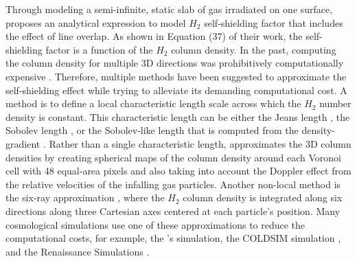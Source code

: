 \documentclass[linenumbers, twocolumn]{aastex631}
\begin{document}
Through modeling a semi-infinite, static slab of gas irradiated on one surface, \cite{Draine+1996} proposes an analytical expression to model $H_{2}$ self-shielding factor that includes the effect of line overlap. As shown in Equation (37) of their work, the self-shielding factor is a function of the $H_{2}$ column density. In the past, computing the column density for multiple 3D directions was prohibitively computationally expensive \citep{Shang+2010, Wolcott-Green+2011}. Therefore, multiple methods have been suggested to approximate the self-shielding effect while trying to alleviate its demanding computational cost. A method is to define a local characteristic length scale across which the $H_{2}$ number density is constant. This characteristic length can be either the Jeans length \citep{Shang+2010, Johnson+2011}, the Sobolev length \citep{Sobolev+1957,Yoshida+2006}, or the Sobolev-like length that is computed from the density-gradient \citep{Gnedin+2009, Gnedin+2011}. Rather than a single characteristic length, \cite{Hartwig+2015} approximates the 3D column densities by creating spherical maps of the column density around each Voronoi cell with 48 equal-area pixels and also taking into account the Doppler effect from the relative velocities of the infalling gas particles. Another non-local method is the six-ray approximation \citep{Yoshida+2003,Yoshida+2007,Glover+2007, Glover+2007a}, where the $H_{2}$ column density is integrated along six directions along three Cartesian axes centered at each particle's position. Many cosmological simulations use one of these approximations to reduce the computational costs, for example, the \citealp{Christensen+2012}'s simulation, the COLDSIM simulation \citep{Maio+2022}, and the Renaissance Simulations \citep{OShea+2015}. %
\end{document}
